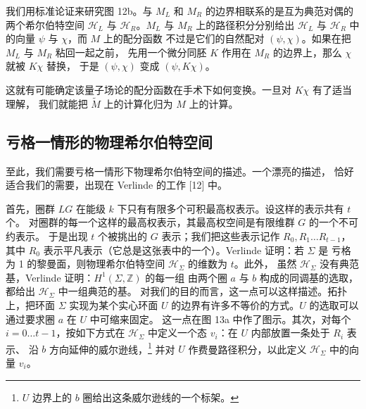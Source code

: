 \documentclass[11pt,a4paper]{article}
\begin{document}
我们用标准论证来研究图 12b。与 $M_L$ 和 $M_R$ 的边界相联系的是互为典范对偶的
两个希尔伯特空间 $\mathcal{H}_L$ 与 $\mathcal{H}_R$。$M_L$ 与 $M_R$ 上的路径积分分别给出
$\mathcal{H}_L$ 与 $\mathcal{H}_R$ 中的向量 $\psi$ 与 $\chi$，而 $M$ 上的配分函数
不过是它们的自然配对 $(\psi,\chi)$。如果在把 $M_L$ 与 $M_R$ 粘回一起之前，
先用一个微分同胚 $K$ 作用在 $M_R$ 的边界上，那么 $\chi$ 就被 $K\chi$ 替换，
于是 $(\psi,\chi)$ 变成 $(\psi,K\chi)$。


这就有可能确定该量子场论的配分函数在手术下如何变换。一旦对 $K\chi$ 有了适当理解，
我们就能把 $\tilde{M}$ 上的计算化归为 $M$ 上的计算。

\subsection{亏格一情形的物理希尔伯特空间}

至此，我们需要亏格一情形下物理希尔伯特空间的描述。一个漂亮的描述，
恰好适合我们的需要，出现在 Verlinde 的工作 [12] 中。

首先，圈群 $LG$ 在能级 $k$ 下只有有限多个可积最高权表示。设这样的表示共有 $t$ 个。
对圈群的每一个这样的最高权表示，其最高权空间是有限维群 $G$ 的一个不可约表示。
于是出现 $t$ 个被挑出的 $G$ 表示；我们把这些表示记作 $R_0,R_1\dots R_{t-1}$，
其中 $R_0$ 表示平凡表示（它总是这张表中的一个）。Verlinde 证明：若 $\Sigma$ 是
亏格为 1 的黎曼面，则物理希尔伯特空间 $\mathcal{H}_\Sigma$ 的维数为 $t$。此外，
虽然 $\mathcal{H}_\Sigma$ 没有典范基，Verlinde 证明：$H^1(\Sigma,\mathbb{Z})$ 的每一组
由两个圈 $a$ 与 $b$ 构成的同调基的选取，都给出 $\mathcal{H}_\Sigma$ 中一组典范的基。
对我们的目的而言，这一点可以这样描述。拓扑上，把环面 $\Sigma$ 实现为某个实心环面 $U$
的边界有许多不等价的方式。$U$ 的选取可以通过要求圈 $a$ 在 $U$ 中可缩来固定。
这一点在图 13a 中作了图示。其次，对每个 $i=0\dots t-1$，按如下方式在
$\mathcal{H}_\Sigma$ 中定义一个态 $v_i$：在 $U$ 内部放置一条处于 $R_i$ 表示、
沿 $b$ 方向延伸的威尔逊线，\footnote{$U$ 边界上的 $b$ 圈给出这条威尔逊线的一个标架。}
并对 $U$ 作费曼路径积分，以此定义 $\mathcal{H}_\Sigma$ 中的向量 $v_i$。
\end{document}
